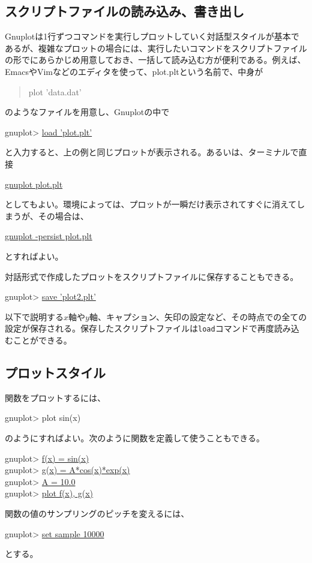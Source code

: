 \subsection{スクリプトファイルの読み込み、書き出し}

Gnuplotは1行ずつコマンドを実行しプロットしていく対話型スタイルが基本であるが、複雑なプロットの場合には、実行したいコマンドをスクリプトファイルの形でにあらかじめ用意しておき、一括して読み込む方が便利である。例えば、EmacsやVimなどのエディタを使って、plot.pltという名前で、中身が
\begin{quote}
    plot 'data.dat'
\end{quote}
のようなファイルを用意し、Gnuplotの中で
\begin{commandline2}
    gnuplot> \underline{load 'plot.plt'}
\end{commandline2} \noindent
と入力すると、上の例と同じプロットが表示される。あるいは、ターミナルで直接
\begin{commandline2}
    \prompt \underline{gnuplot plot.plt}
\end{commandline2} \noindent
としてもよい。環境によっては、プロットが一瞬だけ表示されてすぐに消えてしまうが、その場合は、
\begin{commandline2}
    \prompt \underline{gnuplot -persist plot.plt}
\end{commandline2} \noindent
とすればよい。

対話形式で作成したプロットをスクリプトファイルに保存することもできる。
\begin{commandline2}
    gnuplot> \underline{save 'plot2.plt'}
\end{commandline2} \noindent
以下で説明する\(x\)軸や\(y\)軸、キャプション、矢印の設定など、その時点での全ての設定が保存される。保存したスクリプトファイルは\texttt{load}コマンドで再度読み込むことができる。

\subsection{プロットスタイル}
関数をプロットするには、
\begin{commandline2}
    gnuplot> plot sin(x)
\end{commandline2} \noindent
のようにすればよい。次のように関数を定義して使うこともできる。
\begin{commandline2}
    gnuplot> \underline{f(x) = sin(x)} \\
    gnuplot> \underline{g(x) = A*cos(x)*exp(x)} \\
    gnuplot> \underline{A = 10.0} \\
    gnuplot> \underline{plot f(x), g(x)}
\end{commandline2} \noindent
関数の値のサンプリングのピッチを変えるには、
\begin{commandline2}
    gnuplot> \underline{set sample 10000}
\end{commandline2} \noindent
とする。

